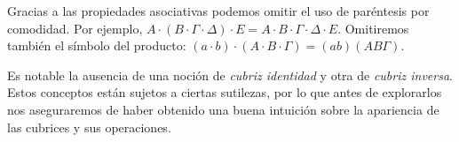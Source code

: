 Gracias a las propiedades asociativas podemos omitir el uso de paréntesis por comodidad. Por ejemplo, $A \cdot (B \cdot \Gamma \cdot \Delta) \cdot E = A \cdot B \cdot \Gamma \cdot \Delta \cdot E$. Omitiremos también el símbolo del producto: $(a\cdot b)\cdot (A \cdot B \cdot \Gamma) = (ab)(AB\Gamma)$.

Es notable la ausencia de una noción de \textit{cubriz identidad} y otra de \textit{cubriz inversa}. Estos conceptos están sujetos a ciertas sutilezas, por lo que antes de explorarlos nos aseguraremos de haber obtenido una buena intuición sobre la apariencia de las cubrices y sus operaciones.
